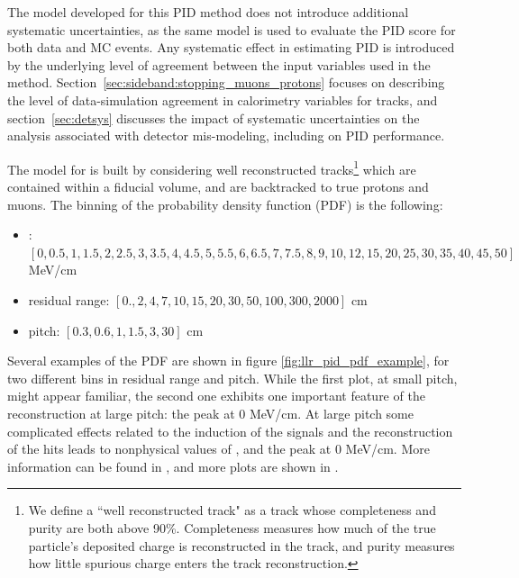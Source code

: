 The model developed for this PID method does not introduce additional systematic uncertainties, as the same model is used to evaluate the PID score for both data and MC events. 
Any systematic effect in estimating PID is introduced by the underlying level of agreement between the input variables used in the method. 
Section~\ref{sec:sideband:stopping_muons_protons} focuses on describing the level of data-simulation agreement in calorimetry variables for tracks, and section~\ref{sec:detsys} discusses the impact of systematic uncertainties on the analysis associated with detector mis-modeling, including on PID performance.

The model for \dedx is built by considering well reconstructed tracks\footnote{ We define a ``well reconstructed track" as a track whose completeness and purity are both above 90\%. Completeness measures how much of the true particle's  deposited charge is reconstructed in the track, and purity measures how little spurious charge enters the track reconstruction. } which are contained within a fiducial volume, and are backtracked to true protons and muons.
The binning of the probability density function (PDF) is the following:
\begin{itemize}
    \item \dedx: $[0, 0.5, 1, 1.5, 2, 2.5, 3, 3.5, 4, 4.5, 5, 5.5, 6, 6.5, 7, 7.5, 8, 9, 10, 12, 15, 20, 25, 30, 35, 40, 45, 50]$ MeV/cm
    \item residual range: $[0., 2, 4, 7, 10, 15, 20, 30, 50, 100, 300, 2000]$ cm
    \item pitch: $[0.3, 0.6, 1, 1.5, 3, 30]$ cm
\end{itemize}
Several examples of the PDF are shown in figure \ref{fig:llr_pid_pdf_example}, for two different bins in residual range and pitch.
While the first plot, at small pitch, might appear familiar, the second one exhibits one important feature of the reconstruction at large pitch: the peak at 0 MeV/cm.
At large pitch some complicated effects related to the induction of the signals and the reconstruction of the hits leads to nonphysical values of \dedx, and the peak at 0 MeV/cm.
More information can be found in \cite{bib:peak_at_zero}, and more plots are shown in \cite{bib:pid_internal_note}.

